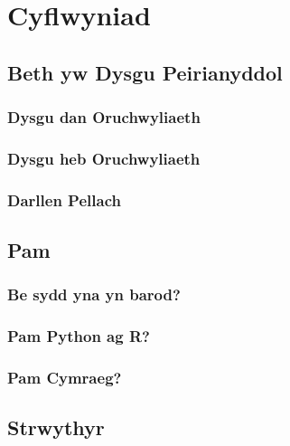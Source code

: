 \chapter{Cyflwyniad}\label{cha:introduction}



\section{Beth yw Dysgu Peirianyddol}\label{sec:intro_pd}
\subsection{Dysgu dan Oruchwyliaeth}


\subsection{Dysgu heb Oruchwyliaeth}


\subsection{Darllen Pellach}


\section{Pam}

\subsection{Be sydd yna yn barod?}

\subsection{Pam Python ag R?}

\subsection{Pam Cymraeg?}


\section{Strwythyr}


